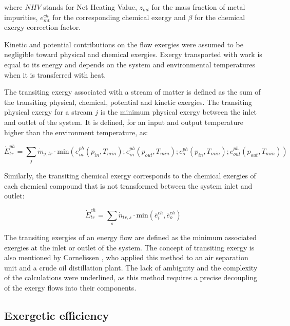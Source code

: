 \documentclass[times,3p]{elsarticle}
\begin{document}
	where $NHV$ stands for Net Heating Value, $z_{mt}$ for the mass fraction of metal impurities, $e^{ch}_{mt}$ for the corresponding chemical exergy and $\beta$ for the chemical exergy correction factor.

	
Kinetic and potential contributions on the flow exergies were assumed to be negligible toward physical and chemical exergies. Exergy transported with work is equal to its energy and depends on the system and environmental temperatures when it is transferred with heat.

The transiting exergy associated with a stream of matter is defined as the sum of the transiting physical, chemical, potential and kinetic exergies. The transiting physical exergy for a stream $j$ is the minimum physical exergy between the inlet and outlet of the system. It is defined, for an input and output temperature higher than the environment temperature, as:

\begin{equation}
\dot{E}^{ph}_{tr} = \sum_j \dot{m}_{j,tr}\cdot\text{min}(e^{ph}_{in}(p_{in},T_{min});e_{in}^{ph}(p_{out},T_{min});e_{o}^{ph}(p_{in},T_{min});e_{out}^{ph}(p_{out},T_{min}))
\end{equation}

Similarly, the transiting chemical exergy corresponds to the chemical exergies of each chemical compound that is not transformed between the system inlet and outlet:

\begin{equation}
\dot{E}^{ch}_{tr} = \sum_s \dot{n}_{tr,s}\cdot\text{min}(\bar{e}^{ch}_i,\bar{e}^{ch}_o)
\end{equation}

The transiting exergies of an energy flow are defined as the minimum associated exergies at the inlet or outlet of the system. The concept of transiting exergy is also mentioned by Cornelissen \cite{Cornelissen1997}, who applied this method to an air separation unit and a crude oil distillation plant. The lack of ambiguity and the complexity of the calculations were underlined, as this method requires a precise decoupling of the exergy flows into their components.
	

\subsection{Exergetic efficiency}
\end{document}
